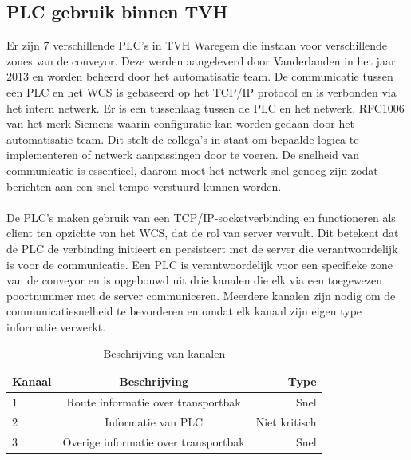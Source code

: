 \subsection{PLC gebruik binnen TVH}
Er zijn 7 verschillende PLC's in TVH Waregem die instaan voor verschillende zones van de conveyor.
Deze werden aangeleverd door Vanderlanden in het jaar 2013 en worden beheerd door het automatisatie team.
De communicatie tussen een PLC en het WCS is gebaseerd op het TCP/IP protocol en is verbonden via het intern netwerk.
Er is een tussenlaag tussen de PLC en het netwerk, RFC1006 van het merk Siemens waarin configuratie kan worden gedaan door het automatisatie team.
Dit stelt de collega's in staat om bepaalde logica te implementeren of netwerk aanpassingen door te voeren.
De snelheid van communicatie is essentieel, daarom moet het netwerk snel genoeg zijn zodat berichten aan een snel tempo verstuurd kunnen worden.
\\\\
De PLC's maken gebruik van een TCP/IP-socketverbinding en functioneren als client ten opzichte van het WCS, dat de rol van server vervult. 
Dit betekent dat de PLC de verbinding initieert en persisteert met de server die verantwoordelijk is voor de communicatie.
Een PLC is verantwoordelijk voor een specifieke zone van de conveyor en is opgebouwd uit drie kanalen die elk via een toegewezen poortnummer met de server communiceren. 
Meerdere kanalen zijn nodig om de communicatiesnelheid te bevorderen en omdat elk kanaal zijn eigen type informatie verwerkt.

\begin{table}[!h]
  \centering
  \begin{tabular}{lcr}
    \toprule
    \textbf{Kanaal} & \textbf{Beschrijving} & \textbf{Type}                        \\
    \midrule
    1                & Route informatie over transportbak          & Snel           \\
    2                & Informatie van PLC                          & Niet kritisch  \\
    3                & Overige informatie over transportbak        & Snel           \\
    \bottomrule
  \end{tabular}
  \caption[Channel assignment]{\label{tab:channel-assignment}Beschrijving van kanalen}
\end{table}

